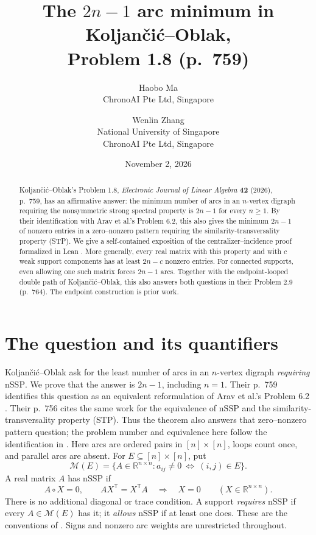 \documentclass[11pt]{article}
\title{The $2n-1$ arc minimum in Koljan\v{c}i\'{c}--Oblak,\\Problem 1.8 (p.~759)}
\author{Haobo Ma\\\small ChronoAI Pte Ltd, Singapore
\and Wenlin Zhang\\\small National University of Singapore\\\small ChronoAI Pte Ltd, Singapore}
\date{November 2, 2026}
\newcommand{\R}{\mathbb R}
\newcommand{\nssp}{\mathrm{nSSP}}
\begin{document}
\maketitle
\begin{abstract}
Koljan\v{c}i\'{c}--Oblak's Problem 1.8, \emph{Electronic Journal of Linear
Algebra} \textbf{42} (2026), p.~759, has an affirmative answer: the minimum
number of arcs in an $n$-vertex digraph requiring the nonsymmetric strong
spectral property is $2n-1$ for every $n\geq1$. By their identification
with Arav et al.'s Problem 6.2, this also gives the minimum $2n-1$ of
nonzero entries in a zero--nonzero pattern requiring the
similarity-transversality property (STP).
We give a self-contained exposition of the centralizer--incidence proof
formalized in Lean \cite{Formal}. More generally, every real matrix with this property and
with $c$ weak support components has at least $2n-c$ nonzero entries.
For connected supports, even allowing one such matrix forces $2n-1$
arcs. Together with the endpoint-looped double path of
Koljan\v{c}i\'{c}--Oblak, this also answers both questions in their
Problem 2.9 (p.~764). The endpoint construction is prior work.
\end{abstract}

\section{The question and its quantifiers}
Koljan\v{c}i\'{c}--Oblak \cite[Problem 1.8, p.~759]{KO} ask for the least
number of arcs in an $n$-vertex digraph \emph{requiring} $\nssp$.
We prove that the answer is $2n-1$, including $n=1$.
Their p.~759 identifies this question as an equivalent reformulation of
Arav et al.'s Problem 6.2 \cite{Arav}. Their p.~756 cites the same work
for the equivalence of $\nssp$ and the similarity-transversality property
(STP). Thus the theorem also answers that zero--nonzero pattern question;
the problem number and equivalence here follow the identification in
\cite[pp.~756, 759]{KO}.
Here arcs are ordered pairs in $[n]\times[n]$, loops count once,
and parallel arcs are absent. For $E\subseteq[n]\times[n]$, put
\[
 \mathcal M(E)=\{A\in\R^{n\times n}:a_{ij}\ne0\ \Longleftrightarrow\ (i,j)\in E\}.
\]
A real matrix $A$ has $\nssp$ if
\begin{equation}\label{eq:nssp}
 A\circ X=0,\qquad AX^{\mathsf T}=X^{\mathsf T}A
 \quad\Longrightarrow\quad X=0
 \qquad(X\in\R^{n\times n}).
\end{equation}
There is no additional diagonal or trace condition. A support
\emph{requires} $\nssp$ if every $A\in\mathcal M(E)$ has it; it
\emph{allows} $\nssp$ if at least one does. These are the conventions
of \cite[Definitions 1.1 and 1.3]{KO}. Signs and nonzero arc weights
are unrestricted throughout.
\end{document}
